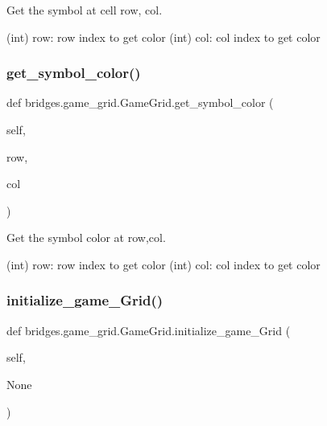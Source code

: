 Get the symbol at cell row, col. 

(int) row\+: row index to get color (int) col\+: col index to get color \mbox{\label{classbridges_1_1game__grid_1_1_game_grid_a7324c15bc6983621ed84964dde173f7f}} 
\subsubsection{\texorpdfstring{get\+\_\+symbol\+\_\+color()}{get\_symbol\_color()}}
{\footnotesize\ttfamily def bridges.\+game\+\_\+grid.\+Game\+Grid.\+get\+\_\+symbol\+\_\+color (\begin{DoxyParamCaption}\item[{}]{self,  }\item[{}]{row,  }\item[{}]{col }\end{DoxyParamCaption})}



Get the symbol color at row,col. 

(int) row\+: row index to get color (int) col\+: col index to get color \mbox{\label{classbridges_1_1game__grid_1_1_game_grid_aefa77d94a0f5d43d029e5bb9856dd911}} 
\subsubsection{\texorpdfstring{initialize\+\_\+game\+\_\+\+Grid()}{initialize\_game\_Grid()}}
{\footnotesize\ttfamily def bridges.\+game\+\_\+grid.\+Game\+Grid.\+initialize\+\_\+game\+\_\+\+Grid (\begin{DoxyParamCaption}\item[{}]{self,  }\item[{}]{None }\end{DoxyParamCaption})}



